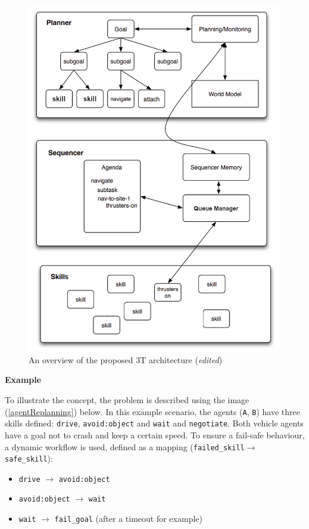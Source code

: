 \documentclass[main.tex]{subfiles}
\begin{document}
\begin{figure}[htbp]
    \centering
    \includegraphics[width=.8\textwidth]{3T-arch-edited.png}
    \caption{An overview of the proposed 3T architecture \cite{Binder2022} (\emph{edited})}
    \label{3t-arch-detailed}
\end{figure}
\pagebreak

\textbf{Example}

To illustrate the concept, the problem is described using the image (\ref{agentReplanning})
below. In this example scenario, the agents (\texttt{A}, \texttt{B}) have three skills defined:
\texttt{drive}, \texttt{avoid:object} and \texttt{wait} and \texttt{negotiate}. Both vehicle agents have a goal not
to crash and keep a certain speed. To ensure a fail-safe behaviour, a dynamic workflow is used, 
defined as a mapping (\texttt{failed\_skill}$\rightarrow$\texttt{safe\_skill}): 

\begin{itemize}
    \item \texttt{drive} $\rightarrow$ \texttt{avoid:object}
    \item \texttt{avoid:object} $\rightarrow$ \texttt{wait}
    \item \texttt{wait} $\rightarrow$ \texttt{fail\_goal} (after a timeout for example)
\end{itemize}
\end{document}
